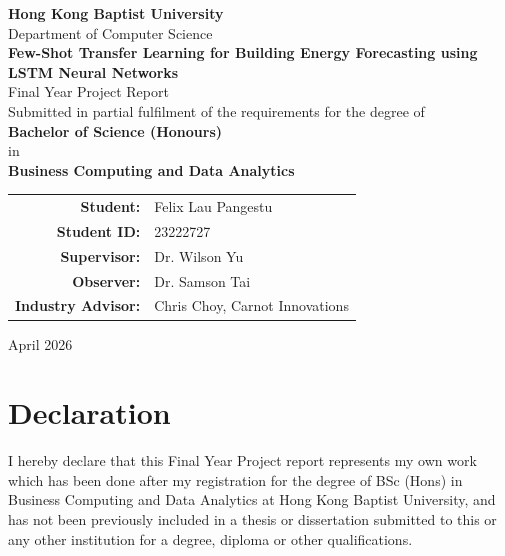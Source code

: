 \documentclass[12pt,a4paper]{report}
\begin{document}
\begin{titlepage}
    \centering
    \vspace*{1cm}
    
    {\LARGE\textbf{Hong Kong Baptist University}}\\[0.5cm]
    {\large Department of Computer Science}\\[2cm]
    
    {\huge\textbf{Few-Shot Transfer Learning for Building Energy Forecasting using LSTM Neural Networks}}\\[2cm]
    
    {\Large Final Year Project Report}\\[1cm]
    
    {\large Submitted in partial fulfilment of the requirements for the degree of}\\[0.5cm]
    {\Large\textbf{Bachelor of Science (Honours)}}\\
    {\large in}\\
    {\Large\textbf{Business Computing and Data Analytics}}\\[2cm]
    
    \begin{tabular}{rl}
        \textbf{Student:} & Felix Lau Pangestu \\
        \textbf{Student ID:} & 23222727 \\[0.5cm]
        \textbf{Supervisor:} & Dr. Wilson Yu \\
        \textbf{Observer:} & Dr. Samson Tai \\[0.5cm]
        \textbf{Industry Advisor:} & Chris Choy, Carnot Innovations \\
    \end{tabular}
    
    \vfill
    
    {\large April 2026}
\end{titlepage}

\chapter*{Declaration}

I hereby declare that this Final Year Project report represents my own work which has been done after my registration for the degree of BSc (Hons) in Business Computing and Data Analytics at Hong Kong Baptist University, and has not been previously included in a thesis or dissertation submitted to this or any other institution for a degree, diploma or other qualifications.
\end{document}
